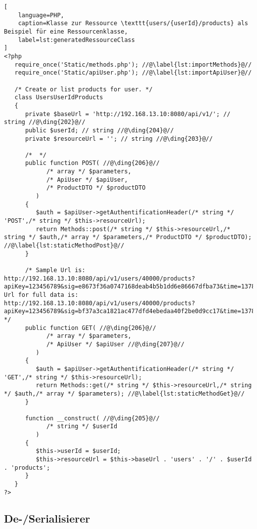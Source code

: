 \begin{lstlisting}[
    language=PHP,
    caption=Klasse zur Ressource \texttt{users/{userId}/products} als Beispiel für eine Ressourcenklasse,
    label=lst:generatedRessourceClass
]
<?php
   require_once('Static/methods.php'); //@\label{lst:importMethods}@//
   require_once('Static/apiUser.php'); //@\label{lst:importApiUser}@//

   /* Create or list products for user. */
   class UsersUserIdProducts
   {
      private $baseUrl = 'http://192.168.13.10:8080/api/v1/'; // string //@\ding{202}@//
      public $userId; // string //@\ding{204}@//
      private $resourceUrl = ''; // string //@\ding{203}@//

      /*  */
      public function POST( //@\ding{206}@//
            /* array */ $parameters,
            /* ApiUser */ $apiUser,
            /* ProductDTO */ $productDTO
         )
      {
         $auth = $apiUser->getAuthentificationHeader(/* string */ 'POST',/* string */ $this->resourceUrl);
         return Methods::post(/* string */ $this->resourceUrl,/* string */ $auth,/* array */ $parameters,/* ProductDTO */ $productDTO); //@\label{lst:staticMethodPost}@//
      }

      /* Sample Url is:  http://192.168.13.10:8080/api/v1/users/40000/products?apiKey=123456789&sig=e8673f36a0747168deab4b5b1dd6e86667dfba73&time=1378985680084&sessionId=123Sample Url for full data is:  http://192.168.13.10:8080/api/v1/users/40000/products?apiKey=123456789&sig=bf37a3ca1821ac477dfd4ebedaa40f2be0d9cc17&time=1378985680108&sessionId=123&fullData=true&limit=10 */
      public function GET( //@\ding{206}@//
            /* array */ $parameters,
            /* ApiUser */ $apiUser //@\ding{207}@//
         )
      {
         $auth = $apiUser->getAuthentificationHeader(/* string */ 'GET',/* string */ $this->resourceUrl);
         return Methods::get(/* string */ $this->resourceUrl,/* string */ $auth,/* array */ $parameters); //@\label{lst:staticMethodGet}@//
      }

      function __construct( //@\ding{205}@//
            /* string */ $userId
         )
      {
         $this->userId = $userId;
         $this->resourceUrl = $this->baseUrl . 'users' . '/' . $userId . 'products';
      }
   }
?>
\end{lstlisting}

\subsection{De-/Serialisierer}
\label{sec:serialiser}

